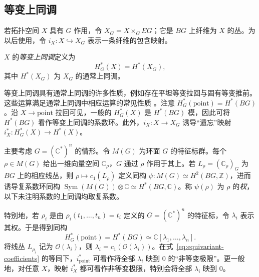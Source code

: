 \subsection{等变上同调}\label{subsec:equivariant-cohomology}
若拓扑空间 $X$ 具有 $G$ 作用，令 $X_G=X\times_GEG$；它是 $BG$ 上纤维为 $X$ 的丛。为以后使用，令 $i_X:X\hookrightarrow X_G$ 表示一条纤维的包含映射。
\begin{definition}\label{def:equivariant-cohomology}
$X$ 的\emph{等变上同调}定义为
\[
H_G^*(X)=H^*(X_G),
\]
其中 $H^*(X_G)$ 为 $X_G$ 的通常上同调。
\end{definition}
等变上同调具有通常上同调的许多性质，例如存在平坦等变拉回与固有等变推前。这些运算满足通常上同调中相应运算的常见性质 。注意 $H_G^*(\mathrm{point})=H^*(BG)$。沿 $X\to\mathrm{point}$ 拉回可见，一般的 $H_G^*(X)$ 是 $H^*(BG)$ 模，因此可将 $H^*(BG)$ 看作等变上同调的系数环。此外，$i_X:X\to X_G$ 诱导“遗忘”映射 $i_X^*:H_G^*(X)\to H^*(X)$。

主要考虑 $G=(\mathbb C^*)^n$ 的情形。令 $M(G)$ 为环面 $G$ 的特征标群。每个 $\rho\in M(G)$ 给出一维向量空间 $\mathbb C_\rho$，$G$ 通过 $\rho$ 作用于其上。若 $L_\rho=(\mathbb C_\rho)_G$ 为 $BG$ 上的相应线丛，则 $\rho\mapsto c_1(L_\rho)$ 定义同构 $\psi:M(G)\simeq H^2(BG,\mathbb Z)$，进而诱导复系数环同构 $\operatorname{Sym}(M(G))\otimes\mathbb C\simeq H^*(BG,\mathbb C)$。称 $\psi(\rho)$ 为 $\rho$ 的\emph{权}，以下未注明系数的上同调均取复系数。

特别地，若 $\rho_i$ 是由 $\rho_i(t_1,\ldots,t_n)=t_i$ 定义的 $G=(\mathbb C^*)^n$ 的特征标，令 $\lambda_i$ 表示其权。于是得到同构
\begin{equation}\label{eq:equivariant-coefficients}
H_G^*(\mathrm{point})=H^*(BG)\simeq\mathbb C[\lambda_1,\ldots,\lambda_n].
\end{equation}
将线丛 $L_{\rho_i}$ 记为 $\mathcal O(\lambda_i)$，则 $\lambda_i=c_1(\mathcal O(\lambda_i))$。在式~\eqref{eq:equivariant-coefficients} 的等同下，$i_{\mathrm{point}}^*$ 可看作将全部 $\lambda_i$ 映到 $0$ 的“非等变极限”。更一般地，对任意 $X$，映射 $i_X^*$ 都可看作非等变极限，特别会将全部 $\lambda_i$ 映到 $0$。

